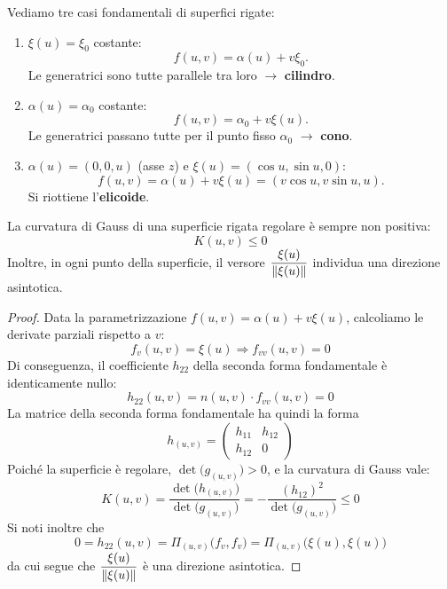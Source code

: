        \begin{esempio}
        Vediamo tre casi fondamentali di superfici rigate:
        \begin{enumerate}
            \item $\xi(u) = \xi_0$ costante:
            \[
            f(u,v) = \alpha(u) + v \xi_0.
            \]
            Le generatrici sono tutte parallele tra loro $\longrightarrow$ \textbf{cilindro}.
            \item $\alpha(u) = \alpha_0$ costante:
            \[
            f(u,v) = \alpha_0 + v \xi(u).
            \]
            Le generatrici passano tutte per il punto fisso $\alpha_0$ $\longrightarrow$ \textbf{cono}.
            \item $\alpha(u) = (0,0,u)$ (asse $z$) e $\xi(u) = (\cos u, \sin u, 0)$:
            \[
            f(u,v) = \alpha(u) + v \xi(u) = (v \cos u, v \sin u, u).
            \]
            Si riottiene l'\textbf{elicoide}.
        \end{enumerate}
        \end{esempio}
        \begin{proposizione}
        \mbox{}

        La curvatura di Gauss di una superficie rigata regolare è sempre non positiva:
        \[
        K(u,v) \le 0
        \]
        Inoltre, in ogni punto della superficie, il versore $\dfrac{\xi(u)}{\lVert\xi(u)\rVert}$ individua una direzione asintotica.
        \end{proposizione}
        \begin{proof}
        \mbox{}

        Data la parametrizzazione $f(u,v) = \alpha(u) + v \xi(u)$, calcoliamo le derivate parziali rispetto a $v$:
        \[
        f_v(u,v) = \xi(u) \Rightarrow f_{vv}(u,v) = 0
        \]
        Di conseguenza, il coefficiente $h_{22}$ della seconda forma fondamentale è identicamente nullo:
        \[
        h_{22}(u,v) = n(u,v) \cdot f_{vv}(u,v) = 0
        \]
        La matrice della seconda forma fondamentale ha quindi la forma
        \[
        h_{(u,v)} = 
        \begin{pmatrix}
        h_{11} & h_{12} \\
        h_{12} & 0
        \end{pmatrix}
        \]
        Poiché la superficie è regolare, $\det\bigl(g_{(u,v)}\bigr) > 0$, e la curvatura di Gauss vale:
        \[
        K(u,v) = \frac{\det\bigl(h_{(u,v)}\bigr)}{\det\bigl(g_{(u,v)}\bigr)} = -\frac{(h_{12})^2}{\det\bigl(g_{(u,v)}\bigr)} \le 0
        \]
        Si noti inoltre che
        \[
        0 = h_{22}(u,v) = \Pi_{(u,v)}\bigl(f_v, f_v\bigr) = \Pi_{(u,v)}\bigl(\xi(u), \xi(u)\bigr)
        \]
        da cui segue che $\dfrac{\xi(u)}{\lVert\xi(u)\rVert}$ è una direzione asintotica.
        \end{proof}